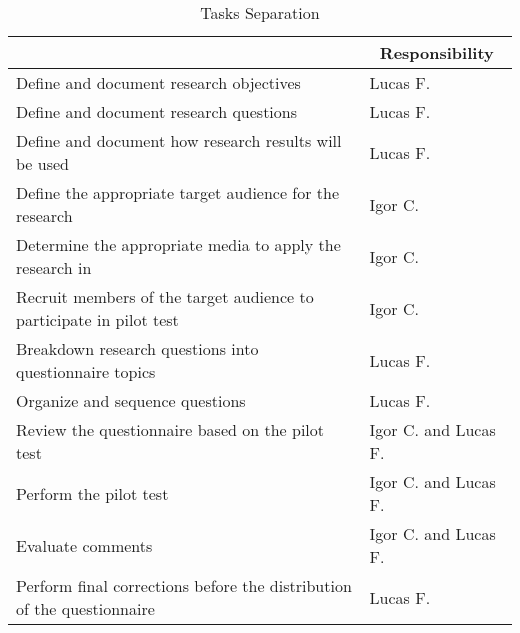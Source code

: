 \begin{table}[!htb]
  \centering
  \caption{Tasks Separation}
  \label{tbl:survey-tasks}
  \footnotesize
  \begin{tabular}{l|l}
    \bottomrule
    \rowcolor[rgb]{0.753,0.753,0.753} \multicolumn{1}{c|}{\textbf{Activity}}                             & \multicolumn{1}{c}{\textbf{Responsibility}} \\
    \hline
    \rowcolor[rgb]{0.898,0.898,0.898} Define and document research objectives                            & Lucas F.                                    \\
    Define and document research questions                                                               & Lucas F.                                    \\
    \rowcolor[rgb]{0.898,0.898,0.898} Define and document how research results will be used              & Lucas F.                                    \\
    Define the appropriate target audience for the research                                              & Igor C.                                     \\
    \rowcolor[rgb]{0.898,0.898,0.898} Determine the appropriate media to apply the research in           & Igor C.                                     \\
    Recruit members of the target audience to participate in pilot test                                  & Igor C.                                     \\
    \rowcolor[rgb]{0.898,0.898,0.898} Breakdown research questions into questionnaire topics             & Lucas F.                                    \\
    Organize and sequence questions                                                                      & Lucas F.                                    \\
    \rowcolor[rgb]{0.898,0.898,0.898} Review the questionnaire based on the pilot test                   & Igor C. and Lucas F.                        \\
    Perform the pilot test                                                                               & Igor C. and Lucas F.                        \\
    \rowcolor[rgb]{0.898,0.898,0.898} Evaluate comments                                                  & Igor C. and Lucas F.                        \\
    Perform final corrections before the distribution of the questionnaire                               & Lucas F.                                    \\

\end{tabular}
\end{table}
